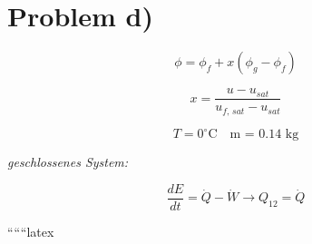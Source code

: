 \section*{Problem d)}

\[
\phi = \phi_f + x \left( \phi_g - \phi_f \right)
\]

\[
x = \frac{u - u_{sat}}{u_{f, \, sat} - u_{sat}}
\]

\[
T = 0^\circ \text{C} \quad \text{m = 0.14 kg}
\]

\textit{geschlossenes System:}

\[
\frac{dE}{dt} = \dot{Q} - \dot{W} \rightarrow Q_{12} = \dot{Q}
\]

``````latex